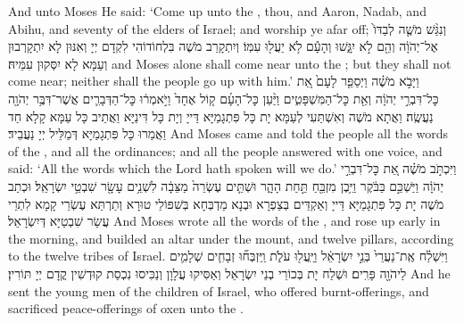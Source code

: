 {And unto Moses He said: ‘Come up unto the \lord, thou, and Aaron, Nadab, and Abihu, and seventy of the elders of Israel; and worship ye afar off;}{}
{וְנִגַּ֨שׁ מֹשֶׁ֤ה לְבַדּוֹ֙ אֶל־יְהֹוָ֔ה וְהֵ֖ם לֹ֣א יִגָּ֑שׁוּ וְהָעָ֕ם לֹ֥א יַעֲל֖וּ עִמּֽוֹ׃
}
{וְיִתְקָרַב מֹשֶׁה בִּלְחוֹדוֹהִי לִקְדָם יְיָ וְאִנּוּן לָא יִתְקָרְבוּן וְעַמָּא לָא יִסְּקוּן עִמֵּיהּ׃}
{and Moses alone shall come near unto the \lord; but they shall not come near; neither shall the people go up with him.’}{}
{וַיָּבֹ֣א מֹשֶׁ֗ה וַיְסַפֵּ֤ר לָעָם֙ אֵ֚ת כׇּל־דִּבְרֵ֣י יְהֹוָ֔ה וְאֵ֖ת כׇּל־הַמִּשְׁפָּטִ֑ים וַיַּ֨עַן כׇּל־הָעָ֜ם ק֤וֹל אֶחָד֙ וַיֹּ֣אמְר֔וּ כׇּל־הַדְּבָרִ֛ים אֲשֶׁר־דִּבֶּ֥ר יְהֹוָ֖ה נַעֲשֶֽׂה׃
}
{וַאֲתָא מֹשֶׁה וְאִשְׁתַּעִי לְעַמָּא יָת כָּל פִּתְגָמַיָּא דַּייָ וְיָת כָּל דִּינַיָּא וַאֲתֵיב כָּל עַמָּא קָלָא חַד וַאֲמַרוּ כָּל פִּתְגָמַיָּא דְּמַלֵּיל יְיָ נַעֲבֵיד׃}
{And Moses came and told the people all the words of the \lord, and all the ordinances; and all the people answered with one voice, and said: ‘All the words which the Lord hath spoken will we do.’}{}
{וַיִּכְתֹּ֣ב מֹשֶׁ֗ה אֵ֚ת כׇּל־דִּבְרֵ֣י יְהֹוָ֔ה וַיַּשְׁכֵּ֣ם בַּבֹּ֔קֶר וַיִּ֥בֶן מִזְבֵּ֖חַ תַּ֣חַת הָהָ֑ר וּשְׁתֵּ֤ים עֶשְׂרֵה֙ מַצֵּבָ֔ה לִשְׁנֵ֥ים עָשָׂ֖ר שִׁבְטֵ֥י יִשְׂרָאֵֽל׃
}
{וּכְתַב מֹשֶׁה יָת כָּל פִּתְגָמַיָּא דַּייָ וְאַקְדֵּים בְּצַפְרָא וּבְנָא מַדְבְּחָא בְּשִׁפּוֹלֵי טוּרָא וְתַרְתַּא עֶשְׂרֵי קָמָא לִתְרֵי עֲשַׂר שִׁבְטַיָּא דְּיִשְׂרָאֵל׃}
{And Moses wrote all the words of the \lord, and rose up early in the morning, and builded an altar under the mount, and twelve pillars, according to the twelve tribes of Israel.}{}
{וַיִּשְׁלַ֗ח אֶֽת־נַעֲרֵי֙ בְּנֵ֣י יִשְׂרָאֵ֔ל וַיַּֽעֲל֖וּ עֹלֹ֑ת וַֽיִּזְבְּח֞וּ זְבָחִ֧ים שְׁלָמִ֛ים לַיהֹוָ֖ה פָּרִֽים׃
}
{וּשְׁלַח יָת בְּכוֹרֵי בְנֵי יִשְׂרָאֵל וְאַסִּיקוּ עֲלָוָן וְנַכִּיסוּ נִכְסַת קוּדְשִׁין קֳדָם יְיָ תּוֹרִין׃}
{And he sent the young men of the children of Israel, who offered burnt-offerings, and sacrificed peace-offerings of oxen unto the \lord.}{}
